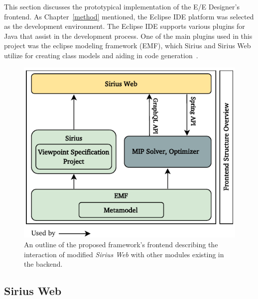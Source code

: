     This section discusses the prototypical implementation of the E/E Designer's frontend.
    As Chapter~\ref{method} mentioned, the Eclipse IDE platform was selected as the development environment. The Eclipse IDE supports various plugins for Java that assist in the development process. One of the main plugins used in this project was the eclipse modeling framework (EMF), which Sirius and Sirius Web utilize for creating class models and aiding in code generation~\cite{eclipse}.
    
           \begin{figure}[b!]
    	\centering
    	\includegraphics[width=0.7\columnwidth]{figures/frontend_st1.pdf}
    	\caption{An outline of the proposed framework's frontend describing the interaction of modified \textit{Sirius Web} with other modules existing in the backend.}
    	\label{fig12}
    \end{figure}
    
    \subsection{Sirius Web}
     
